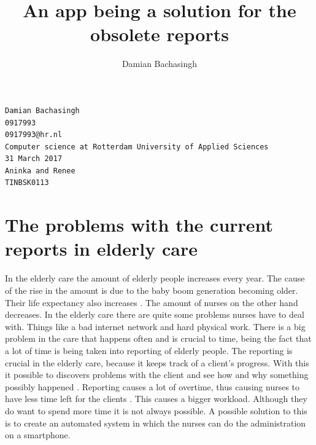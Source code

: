 \documentclass{article}
\begin{document}
\author{Damian Bachasingh}
\title{An app being a solution for the obsolete reports}
\clearpage
\maketitle
\thispagestyle{empty}

\begin{verbatim}
Damian Bachasingh	
0917993
0917993@hr.nl
Computer science at Rotterdam University of Applied Sciences 
31 March 2017
Aninka and Renee
TINBSK0113
\end{verbatim}

	\newpage
	\tableofcontents
	\newpage

\section{The problems with the current reports in elderly care}
In the elderly care the amount of elderly people increases every year. The cause of the rise in the amount is due to the baby boom generation becoming older. Their life expectancy also increases \cite{1}. The amount of nurses on the other hand decreases.
In the elderly care there are quite some problems nurses have to deal with. Things like a bad internet network and hard physical work. There is a big problem in the care that happens often and is crucial to time, being the fact that a lot of time is being taken into reporting of elderly people. 
The reporting is crucial in the elderly care, because it keeps track of a client’s progress. With this it possible to discovers problems with the client and see how and why something possibly happened \cite{2}. Reporting causes a lot of overtime, thus causing nurses to have less time left for the clients \cite{3}. This causes a bigger workload. Although they do want to spend more time it is not always  possible.        A possible solution to this is to create an automated system in which the nurses can do the administration on a smartphone.
\end{document}
